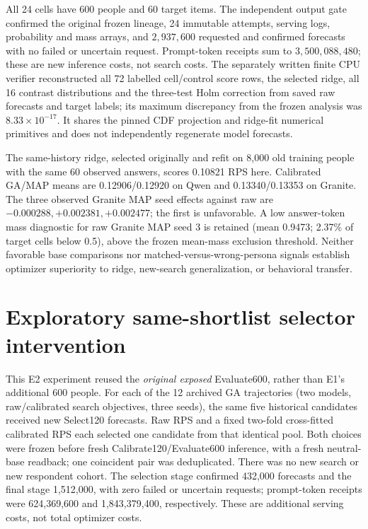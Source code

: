 \documentclass[10pt,twocolumn]{article}
\begin{document}
All 24 cells have 600 people and 60 target items. The independent output gate
confirmed the original frozen lineage, 24 immutable attempts, serving logs,
probability and mass arrays, and $2{,}937{,}600$ requested and confirmed
forecasts with no failed or uncertain request. Prompt-token receipts sum to
$3{,}500{,}088{,}480$; these are new inference costs, not search costs.
The separately written finite CPU verifier reconstructed all 72 labelled
cell/control score rows, the selected ridge, all 16 contrast distributions
and the three-test Holm correction from saved raw forecasts and target labels;
its maximum discrepancy from the frozen analysis was
$8.33\times10^{-17}$. It shares the pinned CDF projection and ridge-fit
numerical primitives and does not independently regenerate model forecasts.

The same-history ridge, selected originally and refit on 8,000 old training
people with the same 60 observed answers, scores 0.10821 RPS here. Calibrated
GA/MAP means are 0.12906/0.12920 on Qwen and 0.13340/0.13353 on Granite.
The three observed Granite MAP seed effects against raw are
$-0.000288,+0.002381,+0.002477$; the first is unfavorable. A low answer-token
mass diagnostic for raw Granite MAP seed 3 is retained (mean 0.9473; 2.37\%
of target cells below 0.5), above the frozen mean-mass exclusion threshold.
Neither favorable base comparisons nor matched-versus-wrong-persona signals
establish optimizer superiority to ridge, new-search generalization, or
behavioral transfer.

\section{Exploratory same-shortlist selector intervention}
This E2 experiment reused the \emph{original exposed} Evaluate600, rather
than E1's additional 600 people. For each of the 12 archived GA trajectories
(two models, raw/calibrated search objectives, three seeds), the same five
historical candidates received new Select120 forecasts. Raw RPS and a fixed
two-fold cross-fitted calibrated RPS each selected one candidate from that
identical pool. Both choices were frozen before fresh Calibrate120/Evaluate600
inference, with a fresh neutral-base readback; one coincident pair was
deduplicated. There was no new search or new respondent cohort. The selection
stage confirmed 432,000 forecasts and the final stage 1,512,000, with zero
failed or uncertain requests; prompt-token receipts were 624,369,600 and
1,843,379,400, respectively. These are additional serving costs, not total
optimizer costs.
\end{document}
